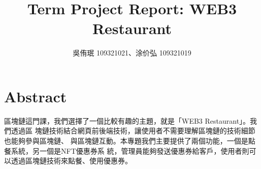 \documentclass[12pt,a4paper]{article}
\title{Term Project Report: WEB3 Restaurant}
\author{吳侑珉 109321021、涂价弘 109321019}
\begin{document}
 \date{} \maketitle

\tableofcontents

\pagebreak

\section{Abstract}

區塊鏈這門課，我們選擇了一個比較有趣的主題，就是「WEB3 Restaurant」。我們透過區
塊鏈技術結合網頁前後端技術，讓使用者不需要理解區塊鏈的技術細節也能夠參與區塊鏈、
與區塊鏈互動。本專題我們主要提供了兩個功能，一個是點餐系統，另一個是NFT優惠券系
統，管理員能夠發送優惠券給客戶，使用者則可以透過區塊鏈技術來點餐、使用優惠券。






\pagebreak
\printbibliography
\end{document}
